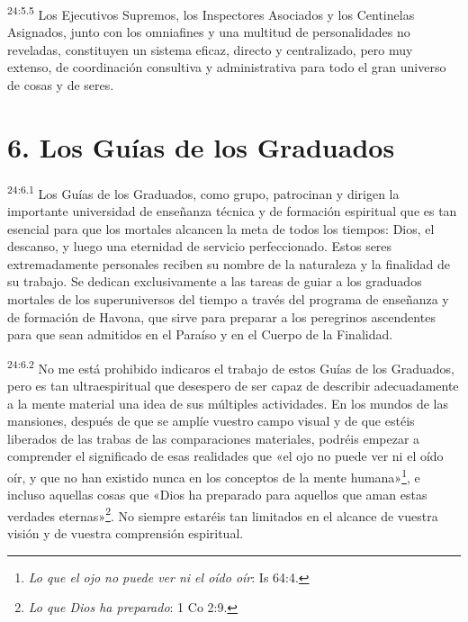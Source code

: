 \par
\textsuperscript{24:5.5} Los Ejecutivos Supremos, los Inspectores Asociados y los Centinelas Asignados, junto con los omniafines y una multitud de personalidades no reveladas, constituyen un sistema eficaz, directo y centralizado, pero muy extenso, de coordinación consultiva y administrativa para todo el gran universo de cosas y de seres.

\section*{6. Los Guías de los Graduados}
\par
\textsuperscript{24:6.1} Los Guías de los Graduados, como grupo, patrocinan y dirigen la importante universidad de enseñanza técnica y de formación espiritual que es tan esencial para que los mortales alcancen la meta de todos los tiempos: Dios, el descanso, y luego una eternidad de servicio perfeccionado. Estos seres extremadamente personales reciben su nombre de la naturaleza y la finalidad de su trabajo. Se dedican exclusivamente a las tareas de guiar a los graduados mortales de los superuniversos del tiempo a través del programa de enseñanza y de formación de Havona, que sirve para preparar a los peregrinos ascendentes para que sean admitidos en el Paraíso y en el Cuerpo de la Finalidad.

\par
\textsuperscript{24:6.2} No me está prohibido indicaros el trabajo de estos Guías de los Graduados, pero es tan ultraespiritual que desespero de ser capaz de describir adecuadamente a la mente material una idea de sus múltiples actividades. En los mundos de las mansiones, después de que se amplíe vuestro campo visual y de que estéis liberados de las trabas de las comparaciones materiales, podréis empezar a comprender el significado de esas realidades que «el ojo no puede ver ni el oído oír, y que no han existido nunca en los conceptos de la mente humana»\footnote{\textit{Lo que el ojo no puede ver ni el oído oír}: Is 64:4.}, e incluso aquellas cosas que «Dios ha preparado para aquellos que aman estas verdades eternas»\footnote{\textit{Lo que Dios ha preparado}: 1 Co 2:9.}. No siempre estaréis tan limitados en el alcance de vuestra visión y de vuestra comprensión espiritual.

